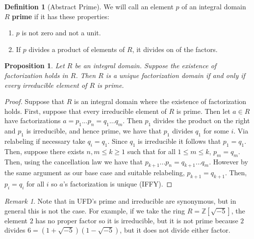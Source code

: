 \documentclass[12pt]{article}
\newtheorem{prop}[thm]{Proposition}
\theoremstyle{definition}
\newtheorem{defn}[thm]{Definition}
\theoremstyle{remark}
\newtheorem{rmk}[thm]{Remark}
\numberwithin{equation}{section}
\newcommand\Z{\mathbb Z}    %
\newcommand\B[1]{\textbf{ #1}}
\begin{document}
\vspace{15pt}


\begin{defn}[Abstract Prime]
        We will call an element $p$ of an integral domain $R$ \B{prime} if it has these properties: \begin{enumerate}
                \item $p$ is not zero and not a unit.
                \item If $p$ divides a product of elements of $R$, it divides on of the factors.
        \end{enumerate}
\end{defn}


\vspace{15pt}


\begin{prop}
        Let $R$ be an integral domain. Suppose the existence of factorization holds in $R$. Then $R$ is a unique factorization domain if and only if every irreducible element of $R$ is prime.
\end{prop}
\begin{proof}
        Suppose that $R$ is an integral domain where the existence of factorization holds. First, suppose that every irreducible element of $R$ is prime. Then let $a \in R$ have factorizations $a = p_1...p_n = q_1...q_m$. Then $p_1$ divides the product on the right and $p_1$ is irreducible, and hence prime, we have that $p_1$ divides $q_1$ for some $i$. Via relabeling if necessary take $q_i = q_1$. Since $q_1$ is irreducible it follows that $p_1 = q_1$. Then, suppose there exists $n,m\leq k \geq 1$ such that for all $1 \leq m \leq k$, $p_m = q_m$. Then, using the cancellation law we have that $p_{k+1}...p_n = q_{k+1}...q_m$. However by the same argument as our base case and suitable relabeling, $p_{k+1} = q_{k+1}$. Then, $p_i = q_i$ for all $i$ so $a$'s factorization is unique (IFFY).
\end{proof}

\vspace{15pt}

\begin{rmk}
        Note that in UFD's prime and irreducible are synonymous, but in general this is not the case. For example, if we take the ring $R=\Z[\sqrt{-5}]$, the element $2$ has no proper factor so it is irreducible, but it is not prime because $2$ divides $6 = (1+\sqrt{-5})(1-\sqrt{-5})$, but it does not divide either factor.
\end{rmk}
\end{document}
